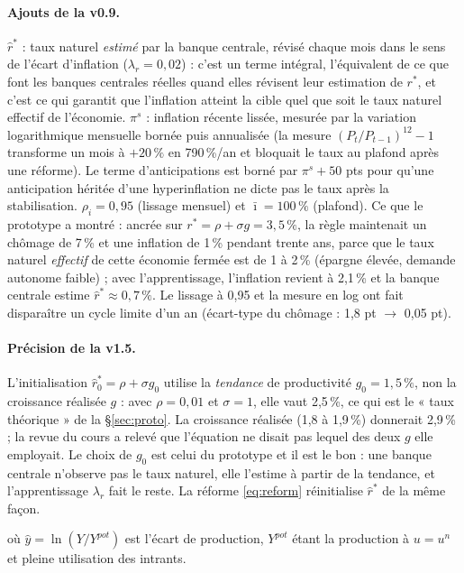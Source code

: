 \documentclass[11pt,a4paper]{article}
\begin{document}
\begin{lecture}
\paragraph{Ajouts de la v0.9.} $\hat r^\ast$ : taux naturel \emph{estimé} par la banque centrale, révisé chaque mois dans le sens de l'écart d'inflation ($\lambda_r=0{,}02$) : c'est un terme intégral, l'équivalent de ce que font les banques centrales réelles quand elles révisent leur estimation de $r^\ast$, et c'est ce qui garantit que l'inflation atteint la cible quel que soit le taux naturel effectif de l'économie. $\pi^s$ : inflation récente lissée, mesurée par la variation logarithmique mensuelle bornée puis annualisée (la mesure $(P_t/P_{t-1})^{12}-1$ transforme un mois à $+20\,\%$ en 790\,\%/an et bloquait le taux au plafond après une réforme). Le terme d'anticipations est borné par $\pi^s+50$ pts pour qu'une anticipation héritée d'une hyperinflation ne dicte pas le taux après la stabilisation. $\rho_i=0{,}95$ (lissage mensuel) et $\bar\imath=100\,\%$ (plafond). Ce que le prototype a montré : ancrée sur $r^\ast=\rho+\sigma g=3{,}5\,\%$, la règle maintenait un chômage de 7\,\% et une inflation de 1\,\% pendant trente ans, parce que le taux naturel \emph{effectif} de cette économie fermée est de 1 à 2\,\% (épargne élevée, demande autonome faible) ; avec l'apprentissage, l'inflation revient à 2,1\,\% et la banque centrale estime $\hat r^\ast\approx0{,}7\,\%$. Le lissage à 0,95 et la mesure en log ont fait disparaître un cycle limite d'un an (écart-type du chômage : 1,8 pt $\to$ 0,05 pt).
\paragraph{Précision de la v1.5.} L'initialisation $\hat r^\ast_0=\rho+\sigma g_0$ utilise la \emph{tendance} de productivité $g_0=1{,}5\,\%$, non la croissance réalisée $g$ : avec $\rho=0{,}01$ et $\sigma=1$, elle vaut 2,5\,\%, ce qui est le « taux théorique » de la \S\ref{sec:proto}. La croissance réalisée (1,8 à 1,9\,\%) donnerait 2,9\,\% ; la revue du cours a relevé que l'équation ne disait pas lequel des deux $g$ elle employait. Le choix de $g_0$ est celui du prototype et il est le bon : une banque centrale n'observe pas le taux naturel, elle l'estime à partir de la tendance, et l'apprentissage $\lambda_r$ fait le reste. La réforme \eqref{eq:reform} réinitialise $\hat r^\ast$ de la même façon.
\end{lecture}
où $\hat y = \ln(Y/Y^{pot})$ est l'écart de production, $Y^{pot}$ étant la production à $u = u^n$ et pleine utilisation des intrants.
\end{document}
